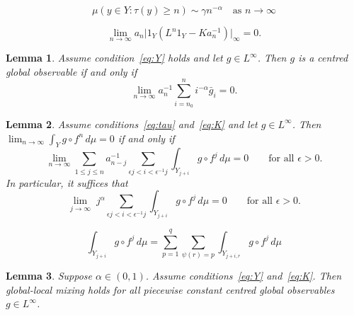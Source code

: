 \documentclass[10pt,a4paper]{amsart}
\newtheorem{lemma}{Lemma}
\newcommand{\eps}{\epsilon}
\begin{document}
\begin{equation} \label{eq:tau}
\mu(y\in Y:\tau(y)\ge n) \sim \gamma n^{-\alpha}
\quad\text{as $n\to\infty$}
\end{equation}

\begin{equation} \label{eq:K}
	\lim_{n\to\infty}a_n\big|1_Y(L^n1_Y-Ka_n^{-1})\big|_\infty =0.
\end{equation}

\begin{lemma} \label{lem:g}
Assume condition~\eqref{eq:Y} holds and let 
$g\in L^\infty$. Then  $g$ is a centred global observable if and only if
\begin{equation} \label{eq:g}
	\lim_{n\to\infty} a_n^{-1}\sum_{i=n_0}^n i^{-\alpha}\bar g_i=0.
\end{equation}
\end{lemma}

\begin{lemma}  \label{lem:K}
Assume conditions~\eqref{eq:tau} and~\eqref{eq:K} and let 
$g\in L^\infty$. Then $\lim_{n\to\infty} \int_Y g\circ f^n\,d\mu=0$ if and only if 
\[
\lim_{n\to\infty}\sum_{1\le j\le n}
a_{n-j}^{-1} \sum_{\eps j<i< \eps^{-1}j}\int_{Y_{j+i}}g\circ f^j\,d\mu=0
\qquad\text{for all $\eps>0$}.
\]
In particular, it suffices that
\[
\lim_{j\to\infty}\; j^\alpha \!\!\!\!\!\!
\sum_{\eps j<i< \eps^{-1}j}\int_{Y_{j+i}}g\circ f^j\,d\mu=0
\qquad\text{for all $\eps>0$}.
\]
\end{lemma}

\begin{equation} \label{eq:p}
\int_{Y_{j+i}}g\circ f^j\,d\mu= \sum_{p=1}^q\sum_{\psi(r)=p}\int_{Y_{j+i,r}}g\circ f^j\,d\mu
\end{equation} 

\begin{lemma} \label{lem:pwc}
Suppose $\alpha\in(0,1)$.  Assume
conditions~\eqref{eq:Y} and~\eqref{eq:K}.
Then global-local mixing holds for all piecewise constant centred global observables $g\in L^\infty$.
\end{lemma}
\end{document}
